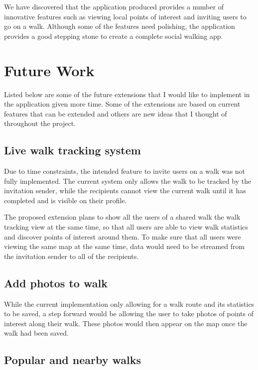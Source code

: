 We have discovered that the application produced provides a number of innovative features such as viewing local points of interest and inviting users to go on a walk. Although some of the features need polishing, the application provides a good stepping stone to create a complete social walking app.

\section{Future Work} \label{section:future-work}

Listed below are some of the future extensions that I would like to implement in the application given more time. Some of the extensions are based on current features that can be extended and others are new ideas that I thought of throughout the project.

\subsection{Live walk tracking system}

Due to time constraints, the intended feature to invite users on a walk was not fully implemented. The current system only allows the walk to be tracked by the invitation sender, while the recipients cannot view the current walk until it has completed and is visible on their profile.

The proposed extension plans to show all the users of a shared walk the walk tracking view at the same time, so that all users are able to view walk statistics and discover points of interest around them. To make sure that all users were viewing the same map at the same time, data would need to be streamed from the invitation sender to all of the recipients.

\subsection{Add photos to walk}

While the current implementation only allowing for a walk route and its statistics to be saved, a step forward would be allowing the user to take photos of points of interest along their walk. These photos would then appear on the map once the walk had been saved.

\subsection{Popular and nearby walks}

